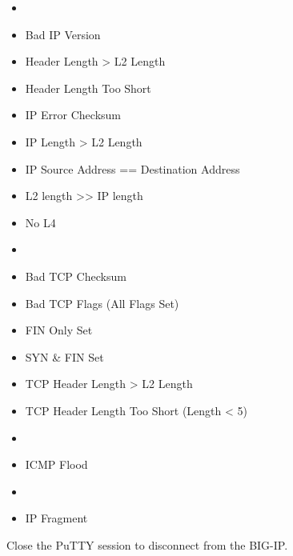 \documentclass[letterpaper,10pt,english]{sphinxmanual}
\begin{document}
\begin{itemize}
\item {} 

\item {} 
Bad IP Version

\item {} 
Header Length \textgreater{} L2 Length

\item {} 
Header Length Too Short

\item {} 
IP Error Checksum

\item {} 
IP Length \textgreater{} L2 Length

\item {} 
IP Source Address == Destination Address

\item {} 
L2 length \textgreater{}\textgreater{} IP length

\item {} 
No L4

\item {} 

\item {} 
Bad TCP Checksum

\item {} 
Bad TCP Flags (All Flags Set)

\item {} 
FIN Only Set

\item {} 
SYN \& FIN Set

\item {} 
TCP Header Length \textgreater{} L2 Length

\item {} 
TCP Header Length Too Short (Length \textless{} 5)

\item {} 

\item {} 
ICMP Flood

\item {} 

\item {} 
IP Fragment

\end{itemize}

Close the PuTTY session to disconnect from the BIG-IP.
\end{document}
